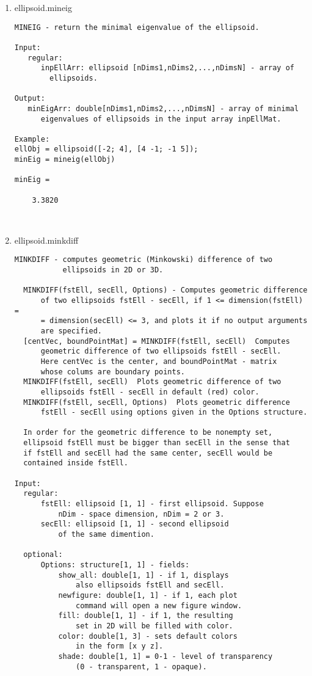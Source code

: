 \begin{enumerate}
\begin{lstlisting}
\end{lstlisting}
\fontfamily{\familydefault}
\selectfont
\item {ellipsoid.mineig}
\selectfont
\begin{lstlisting}
MINEIG - return the minimal eigenvalue of the ellipsoid.

Input:
   regular:
      inpEllArr: ellipsoid [nDims1,nDims2,...,nDimsN] - array of
        ellipsoids.

Output:
   minEigArr: double[nDims1,nDims2,...,nDimsN] - array of minimal
      eigenvalues of ellipsoids in the input array inpEllMat.

Example:
ellObj = ellipsoid([-2; 4], [4 -1; -1 5]);
minEig = mineig(ellObj)

minEig =

    3.3820



\end{lstlisting}
\fontfamily{\familydefault}
\selectfont
\item {ellipsoid.minkdiff}
\selectfont
\begin{lstlisting}
MINKDIFF - computes geometric (Minkowski) difference of two
           ellipsoids in 2D or 3D.

  MINKDIFF(fstEll, secEll, Options) - Computes geometric difference
      of two ellipsoids fstEll - secEll, if 1 <= dimension(fstEll) =
      = dimension(secEll) <= 3, and plots it if no output arguments
      are specified.
  [centVec, boundPointMat] = MINKDIFF(fstEll, secEll)  Computes
      geometric difference of two ellipsoids fstEll - secEll.
      Here centVec is the center, and boundPointMat - matrix
      whose colums are boundary points.
  MINKDIFF(fstEll, secEll)  Plots geometric difference of two
      ellipsoids fstEll - secEll in default (red) color.
  MINKDIFF(fstEll, secEll, Options)  Plots geometric difference
      fstEll - secEll using options given in the Options structure.

  In order for the geometric difference to be nonempty set,
  ellipsoid fstEll must be bigger than secEll in the sense that
  if fstEll and secEll had the same center, secEll would be
  contained inside fstEll.

Input:
  regular:
      fstEll: ellipsoid [1, 1] - first ellipsoid. Suppose
          nDim - space dimension, nDim = 2 or 3.
      secEll: ellipsoid [1, 1] - second ellipsoid
          of the same dimention.

  optional:
      Options: structure[1, 1] - fields:
          show_all: double[1, 1] - if 1, displays
              also ellipsoids fstEll and secEll.
          newfigure: double[1, 1] - if 1, each plot
              command will open a new figure window.
          fill: double[1, 1] - if 1, the resulting
              set in 2D will be filled with color.
          color: double[1, 3] - sets default colors
              in the form [x y z].
          shade: double[1, 1] = 0-1 - level of transparency
              (0 - transparent, 1 - opaque).


\end{lstlisting}
\end{enumerate}
